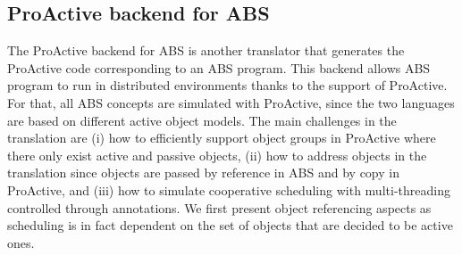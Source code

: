 \subsection{ProActive backend for ABS}
The ProActive backend for ABS is another translator that generates the ProActive code 
corresponding to an ABS program. This backend allows ABS program to run in distributed 
environments thanks to the support of ProActive. For that, all ABS concepts are simulated 
with ProActive, since the two languages are based on different active object models. The 
main challenges in the translation are (i) how to efficiently support object groups in 
ProActive where there only exist active and passive objects, (ii) how to address objects 
in the translation since objects are passed by reference in ABS and by copy in ProActive, 
and (iii) how to simulate cooperative scheduling with multi-threading controlled through 
annotations. We first present object referencing aspects as scheduling is in fact 
dependent on the set of objects that are decided to be active ones.

